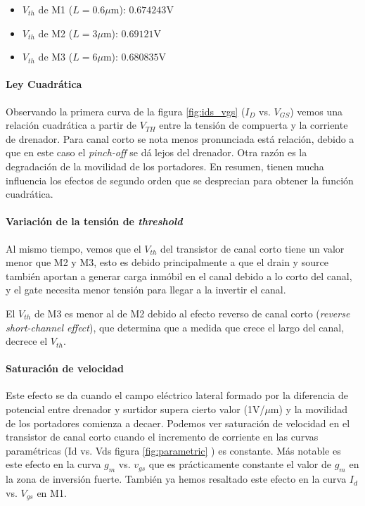 \begin{itemize}
	\item $V_{th}$ de M1 ($L=0.6\mu$m): $0.674243$V
	\item $V_{th}$ de M2 ($L=3\mu$m): $0.69121$V
	\item $V_{th}$ de M3 ($L=6\mu$m): $0.680835$V
\end{itemize}

\paragraph{Ley Cuadrática}

Observando la primera curva de la figura \ref{fig:ids_vgs} ($I_D$ vs. $V_{GS}$) vemos una relación cuadrática a partir de $V_{TH}$ entre la tensión de compuerta y la corriente de drenador. Para canal corto se nota menos pronunciada está relación, debido a que en este caso el \emph{pinch-off} se dá lejos del drenador. Otra razón es la degradación de la movilidad de los portadores. En resumen, tienen mucha influencia los efectos de segundo orden que se desprecian para obtener la función cuadrática. 

\paragraph{Variación de la tensión de \emph{threshold}}
Al mismo tiempo, vemos que el $V_{th}$ del transistor de canal corto tiene un valor menor que M2 y M3, esto es debido principalmente a que el drain y source también aportan a generar carga inmóbil en el canal debido a lo corto del canal, y el gate necesita menor tensión para llegar a la invertir el canal. 

El $V_{th}$ de M3 es menor al de M2 debido al efecto reverso de canal corto (\emph{reverse short-channel effect}), que determina que a medida que crece el largo del canal, decrece el $V_{th}$.

\paragraph{Saturación de velocidad}
Este efecto se da cuando el campo eléctrico lateral formado por la diferencia de potencial entre drenador y surtidor supera cierto valor (1V/$\mu$m) y la movilidad de los portadores comienza a decaer. Podemos ver saturación de velocidad en el transistor de canal corto cuando el incremento de corriente en las curvas paramétricas (Id vs. Vds figura \ref{fig:parametric} ) es constante. Más notable es este efecto en la curva $g_m$ vs. $v_{gs}$ que es prácticamente constante el valor de $g_m$ en la zona de inversión fuerte. También ya hemos resaltado este efecto en la curva $I_d$ vs. $V_{gs}$ en M1.

